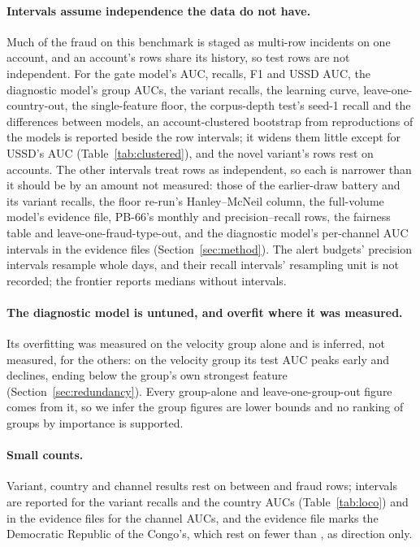 \paragraph{Intervals assume independence the data do not have.} Much of the fraud on this benchmark is staged as
multi-row incidents on one account, and an account's rows share its history, so test rows are not
independent. For the gate model's AUC, recalls, F1 and USSD AUC, the diagnostic model's group AUCs, the variant recalls, the
learning curve, leave-one-country-out, the single-feature floor, the corpus-depth test's seed-1 recall
and the differences between models,
an account-clustered bootstrap from reproductions of the models is reported beside the row intervals;
it widens them little except for USSD's AUC (Table~\ref{tab:clustered}), and the novel variant's
\nNovelRows{} rows rest on \nNovelAccounts{} accounts. The other intervals treat rows as
independent, so each is narrower than it should be by an amount not measured: those of the
earlier-draw battery and its variant recalls, the floor re-run's Hanley--McNeil column, the
full-volume model's evidence file, PB-66's monthly and precision--recall rows, the fairness table
and leave-one-fraud-type-out, and the diagnostic model's per-channel AUC intervals in the evidence
files (Section~\ref{sec:method}). The alert budgets' precision intervals
resample whole days, and their recall intervals' resampling unit is not recorded; the frontier reports medians without
intervals.

\paragraph{The diagnostic model is untuned, and overfit where it was measured.} Its overfitting was measured on the velocity
group alone and is inferred, not measured, for the others: on the velocity group its test AUC
peaks early and declines, ending below the group's own strongest feature
(Section~\ref{sec:redundancy}). Every group-alone and leave-one-group-out figure comes from it, so
we infer the group figures are lower bounds and no ranking of groups by importance is supported.

\paragraph{Small counts.} Variant, country and channel results rest on between \nAdaptFraud{} and
\nBaseVarFraud{} fraud rows; intervals are reported for the variant recalls and the country AUCs (Table~\ref{tab:loco}) and in
the evidence files for the channel AUCs, and the evidence file marks the
Democratic Republic of the Congo's, which rest on fewer than \nSmallCountThreshold{}, as direction
only.

